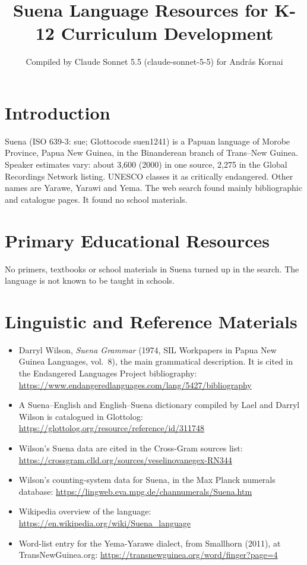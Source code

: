 \documentclass[12pt]{article}
\title{Suena Language Resources for K-12 Curriculum Development}
\author{Compiled by Claude Sonnet 5.5 (claude-sonnet-5-5) for Andr\'as Kornai}
\date{}
\begin{document}
\maketitle

\section{Introduction}
Suena (ISO 639-3: sue; Glottocode suen1241) is a Papuan language of Morobe Province, Papua New Guinea, in the Binanderean branch of Trans--New Guinea. Speaker estimates vary: about 3,600 (2000) in one source, 2,275 in the Global Recordings Network listing. UNESCO classes it as critically endangered. Other names are Yarawe, Yarawi and Yema. The web search found mainly bibliographic and catalogue pages. It found no school materials.

\section{Primary Educational Resources}
No primers, textbooks or school materials in Suena turned up in the search. The language is not known to be taught in schools.

\section{Linguistic and Reference Materials}
\begin{itemize}
\item Darryl Wilson, \emph{Suena Grammar} (1974, SIL Workpapers in Papua New Guinea Languages, vol.\ 8), the main grammatical description. It is cited in the Endangered Languages Project bibliography: \url{https://www.endangeredlanguages.com/lang/5427/bibliography}
\item A Suena--English and English--Suena dictionary compiled by Lael and Darryl Wilson is catalogued in Glottolog: \url{https://glottolog.org/resource/reference/id/311748}
\item Wilson's Suena data are cited in the Cross-Gram sources list: \url{https://crossgram.clld.org/sources/veselinovanegex-RN344}
\item Wilson's counting-system data for Suena, in the Max Planck numerals database: \url{https://lingweb.eva.mpg.de/channumerals/Suena.htm}
\item Wikipedia overview of the language: \url{https://en.wikipedia.org/wiki/Suena_language}
\item Word-list entry for the Yema-Yarawe dialect, from Smallhorn (2011), at TransNewGuinea.org: \url{https://transnewguinea.org/word/finger?page=4}
\end{itemize}
\end{document}
